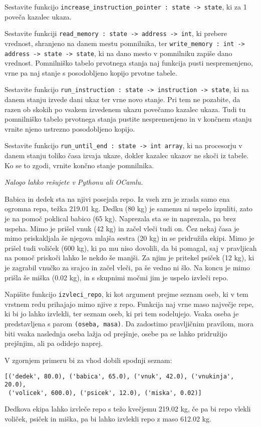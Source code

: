 \documentclass[arhiv]{../izpit}
\begin{document}
\podnaloga
Sestavite funkcijo \verb|increase_instruction_pointer : state -> state|,
ki za 1 poveča kazalec ukaza.

\podnaloga
Sestavite funkciji \verb|read_memory : state -> address -> int|, ki prebere vrednost, shranjeno na danem mestu pomnilnika, ter \verb|write_memory : int -> address -> state -> state|, ki na dano mesto v pomnilniku zapiše dano vrednost. Pomnilniško tabelo prvotnega stanja naj funkcija pusti nespremenjeno, vrne pa naj stanje s posodobljeno kopijo prvotne tabele.

\podnaloga
Sestavite funkcijo \verb|run_instruction : state -> instruction -> state|, ki na danem stanju izvede dani ukaz ter vrne novo stanje. Pri tem ne pozabite, da razen ob skokih po vsakem izvedenem ukazu povečamo kazalec ukaza. Tudi tu pomnilniško tabelo prvotnega stanja pustite nespremenjeno in v končnem stanju vrnite njeno ustrezno posodobljeno kopijo.

\podnaloga
Sestavite funkcijo \verb|run_until_end : state -> int array|, ki na procesorju v danem stanju toliko časa izvaja ukaze, dokler kazalec ukazov ne skoči iz tabele. Ko se to zgodi, vrnite končno stanje pomnilnika.


\naloga

\emph{Nalogo lahko rešujete v Pythonu ali OCamlu.}

Babica in dedek sta na njivi posejala repo. Iz vseh zrn je zrasla samo ena ogromna repa, težka 219.01 kg. Dedku (80 kg) je samemu ni uspelo izpuliti, zato je na pomoč poklical babico (65 kg). Naprezala sta se in naprezala, pa brez uspeha. Mimo je prišel vnuk (42 kg) in začel vleči tudi on. Čez nekaj časa je mimo priskakljala še njegova mlajša sestra (20 kg) in se pridružila ekipi. Mimo je prišel tudi voliček (600 kg), ki pa mu niso dovolili, da bi pomagal, saj v pravljicah na pomoč priskoči lahko le nekdo še manjši. Za njim je pritekel psiček (12 kg), ki je zagrabil vnučko za srajco in začel vleči, pa še vedno ni šlo. Na koncu je mimo prišla še miška (0.02 kg), in s skupnimi močmi jim je uspelo izvleči repo.

Napišite funkcijo \verb|izvleci_repo|, ki kot argument prejme seznam oseb, ki v tem vrstnem redu prihajajo mimo njive z repo. Funkcija naj vrne maso največje repe, ki bi jo lahko izvlekli, ter seznam oseb, ki pri tem sodelujejo. Vsaka oseba je predstavljena s parom \verb|(oseba, masa)|. Da zadostimo pravljičnim pravilom, mora biti vsaka naslednja oseba lažja od prejšnje, osebe pa se lahko pridružijo prejšnjim, ali pa odidejo naprej.

V zgornjem primeru bi za vhod dobili spodnji seznam:

\begin{Verbatim}[fontsize=\small]
[('dedek', 80.0), ('babica', 65.0), ('vnuk', 42.0), ('vnukinja', 20.0),
 ('volicek', 600.0), ('psicek', 12.0), ('miska', 0.02)]
\end{Verbatim}

Dedkova ekipa lahko izvleče repo s težo kvečjemu 219.02 kg, če pa bi repo vlekli voliček, psiček in miška, pa bi lahko izvlekli repo z maso 612.02 kg.
\end{document}
